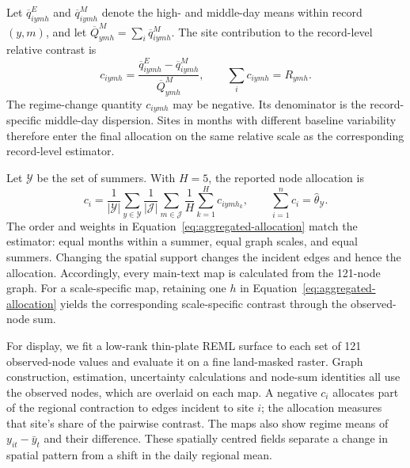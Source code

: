 \documentclass[namedate,webpdf,modern,mediumone]{oup-authoring-template}
\begin{document}
Let $\overline q^{E}_{iymh}$ and $\overline q^{M}_{iymh}$ denote the high- and
middle-day means within record $(y,m)$, and let
$\overline Q^{M}_{ymh}=\sum_i\overline q^{M}_{iymh}$. The site contribution to
the record-level relative contrast is
\begin{equation}
 c_{iymh}=\frac{\overline q^{E}_{iymh}-\overline q^{M}_{iymh}}
 {\overline Q^{M}_{ymh}},
 \qquad \sum_i c_{iymh}=R_{ymh}.
 \label{eq:node-contribution}
\end{equation}
The regime-change quantity $c_{iymh}$ may be negative. Its denominator is the
record-specific middle-day
dispersion. Sites in months with different baseline variability therefore
enter the final allocation on the same relative scale as the corresponding
record-level estimator.

Let $\mathcal Y$ be the set of summers. With $H=5$, the reported node
allocation is
\begin{equation}
 c_i=\frac{1}{|\mathcal Y|}\sum_{y\in\mathcal Y}
 \frac{1}{|\mathcal J|}\sum_{m\in\mathcal J}
 \frac{1}{H}\sum_{k=1}^{H}c_{iymh_k},
 \qquad
 \sum_{i=1}^{n}c_i=\widehat\theta_{\mathcal Y}.
 \label{eq:aggregated-allocation}
\end{equation}
The order and weights in Equation~\eqref{eq:aggregated-allocation} match the
estimator: equal months within a summer, equal graph scales, and equal
summers. Changing
the spatial support changes the incident edges and hence the allocation.
Accordingly, every main-text map is calculated from the 121-node graph. For
a scale-specific map, retaining one $h$ in
Equation~\eqref{eq:aggregated-allocation} yields the corresponding
scale-specific contrast through the observed-node sum.

For display, we fit a low-rank thin-plate REML surface to each set of 121
observed-node values and evaluate it on a fine land-masked raster. Graph
construction, estimation, uncertainty calculations and node-sum identities
all use the observed nodes, which are overlaid on each map. A negative $c_i$
allocates part of the regional contraction to edges incident to site $i$; the
allocation measures that site's share of the pairwise contrast. The maps also show regime
means of $y_{it}-\bar y_t$ and their difference. These spatially centred fields
separate a change in spatial pattern from a shift in the daily regional mean.
\end{document}
